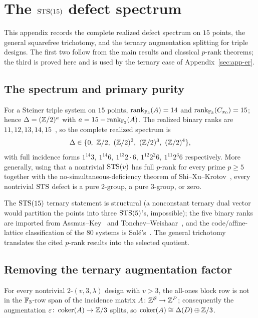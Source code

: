 \section{The \texorpdfstring{$\mathrm{STS}(15)$}{STS(15)} defect spectrum}\label{sec:app-sts}

This appendix records the complete realized defect spectrum on $15$ points, the
general squarefree trichotomy, and the ternary augmentation splitting for triple
designs. The first two follow from the main results
and classical $p$-rank theorems; the third is proved here and is used by the
ternary case of Appendix~\ref{sec:app-er}.

\subsection{The spectrum and primary purity}

\begin{theorem}\label{thm:sts15}
For a Steiner triple system on $15$ points, $\operatorname{rank}_{\mathbb{F}_3}(A)=14$ and
$\operatorname{rank}_{\mathbb{F}_3}(C_{x_0})=15$; hence $\Delta=(\mathbb{Z}/2)^{a}$ with $a=15-\operatorname{rank}_{\mathbb{F}_2}(A)$.
The realized binary ranks are $11,12,13,14,15$~\cite{AssmusKey1992}, so the
complete realized spectrum is
\[
\Delt\in\{0,\ \ZZ/2,\ (\ZZ/2)^{2},\ (\ZZ/2)^{3},\ (\ZZ/2)^{4}\},
\]
with full incidence forms $1^{14}3,\ 1^{14}6,\ 1^{13}2\cdot6,\ 1^{12}2^{2}6,\
1^{11}2^{3}6$ respectively. More generally, using that a nontrivial $\mathrm{STS}(v)$ has
full $p$-rank for every prime $p\ge5$~\cite{DoyenHubautVandensavel} together with
the no-simultaneous-deficiency theorem of Shi--Xu--Krotov~\cite{ShiXuKrotov},
every nontrivial $\mathrm{STS}$ defect is a pure $2$-group, a pure $3$-group, or zero.
\end{theorem}

The $\mathrm{STS}(15)$ ternary statement is structural (a nonconstant ternary dual
vector would partition the points into three $\mathrm{STS}(5)$'s, impossible); the five
binary ranks are imported from Assmus--Key~\cite{AssmusKey1992} and
Tonchev--Weishaar~\cite{TonchevWeishaar}, and the code/affine-lattice
classification of the $80$ systems is Sol\'e's~\cite{Sole1997}. The general
trichotomy translates the cited $p$-rank results into the selected quotient.

\subsection{Removing the ternary augmentation factor}

\begin{proposition}\label{prop:split}
For every nontrivial $2$-$(v,3,\lambda)$ design with $v>3$, the all-ones block
row is not in the $\mathbb{F}_3$-row span of the incidence matrix $A\colon\mathbb{Z}^{\mathcal
B}\to\mathbb{Z}^{P}$; consequently the augmentation
$\varepsilon\colon\operatorname{coker}(A)\to\mathbb{Z}/3$ splits, so
$\operatorname{coker}(A)\cong\Delta(D)\oplus\mathbb{Z}/3$.
\end{proposition}

